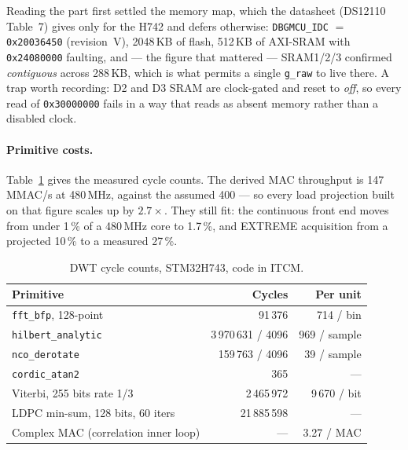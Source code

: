 Reading the part first settled the memory map, which the datasheet
(DS12110 Table~7) gives only for the H742 and defers otherwise:
\texttt{DBGMCU\_IDC} $=$ \texttt{0x20036450} (revision~V), 2048\,KB of
flash, 512\,KB of AXI-SRAM with \texttt{0x24080000} faulting, and ---
the figure that mattered --- SRAM1/2/3 confirmed \emph{contiguous}
across 288\,KB, which is what permits a single \texttt{g\_raw} to live
there. A trap worth recording: D2 and D3 SRAM are clock-gated and reset
to \emph{off}, so every read of \texttt{0x30000000} fails in a way that
reads as absent memory rather than a disabled clock.

\paragraph{Primitive costs.}
Table~\ref{tab:cport_cycles} gives the measured cycle counts. The
derived MAC throughput is 147\,MMAC/s at 480\,MHz, against the assumed
400 --- so every load projection built on that figure scales up by
$2.7\times$. They still fit: the continuous front end moves from under
1\,\% of a 480\,MHz core to 1.7\,\%, and EXTREME acquisition from a
projected 10\,\% to a measured 27\,\%.

\begin{table}[htbp]
    \centering
    \caption{DWT cycle counts, STM32H743, code in ITCM.}
    \label{tab:cport_cycles}
    \small
    \begin{tabular}{@{}lrr@{}}
    \toprule
    \textbf{Primitive} & \textbf{Cycles} & \textbf{Per unit} \\
    \midrule
    \texttt{fft\_bfp}, 128-point & 91\,376 & 714 / bin \\
    \texttt{hilbert\_analytic} & 3\,970\,631 / 4096 & 969 / sample \\
    \texttt{nco\_derotate} & 159\,763 / 4096 & 39 / sample \\
    \texttt{cordic\_atan2} & 365 & --- \\
    Viterbi, 255 bits rate 1/3 & 2\,465\,972 & 9\,670 / bit \\
    LDPC min-sum, 128 bits, 60 iters & 21\,885\,598 & --- \\
    Complex MAC (correlation inner loop) & --- & 3.27 / MAC \\
    \bottomrule
    \end{tabular}
\end{table}

